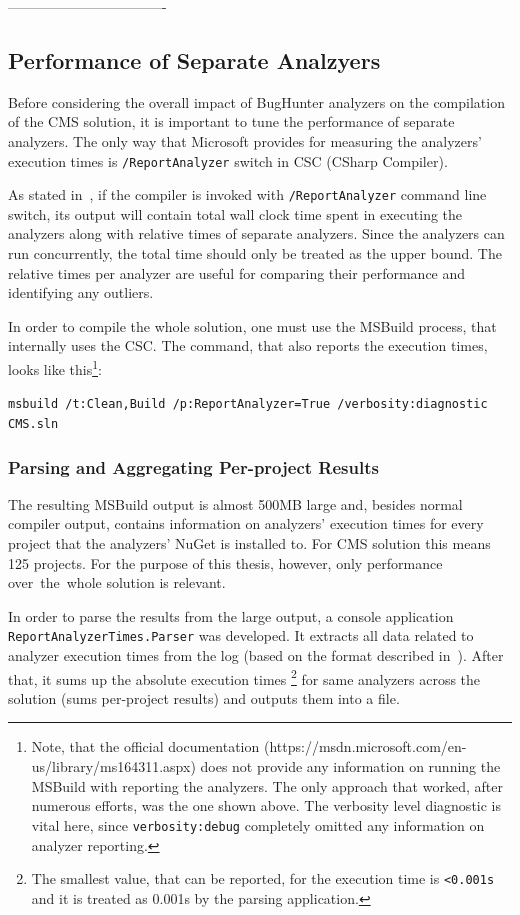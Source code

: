 \documentclass[
  digital, %
  table,   %
  lof,     %
  lot,     %
  oneside,
]{fithesis3}
\begin{document}
----------------------------------

\subsection{Performance of Separate Analzyers}
Before considering the overall impact of BugHunter analyzers on the compilation of the CMS solution, it is important to tune the performance of separate analyzers. The only way that Microsoft provides for measuring the analyzers' execution times is \texttt{/ReportAnalyzer} switch in CSC (CSharp Compiler).

As stated in~\cite{report-analyzer}, if the compiler is invoked with \texttt{/ReportAnalyzer} command line switch, its output will contain total wall clock time spent in executing the analyzers along with relative times of separate analyzers. Since the analyzers can run concurrently, the total time should only be treated as the upper bound. The relative times per analyzer are useful for comparing their performance and identifying any outliers.

In order to compile the whole solution, one must use the MSBuild process, that internally uses the CSC.
The command, that also reports the execution times, looks like this\footnote{Note, that the official documentation (https://msdn.microsoft.com/en-us/library/ms164311.aspx) does not provide any information on running the MSBuild with reporting the analyzers. The only approach that worked, after numerous efforts, was the one shown above. The verbosity level diagnostic is vital here, since \texttt{verbosity:debug} completely omitted any information on analyzer reporting.}:

\begin{center}
\texttt{msbuild /t:Clean,Build /p:ReportAnalyzer=True /verbosity:diagnostic CMS.sln}
\end{center}

\subsubsection{\textbf{Parsing and Aggregating Per-project Results}}
The resulting MSBuild output is almost 500MB large and, besides normal compiler output, contains information on analyzers' execution times for every project that the analyzers' NuGet is installed to. For CMS solution this means 125 projects. For the purpose of this thesis, however, only performance over~the~whole solution is relevant. 

In order to parse the results from the large output, a console application \texttt{ReportAnalyzerTimes.Parser} was developed. It extracts all data related to analyzer execution times from the log (based on the format described in~\cite{report-analyzer}). After that, it sums up the absolute execution times \footnote{The smallest value, that can be reported, for the execution time is \texttt{<0.001s} and it is treated as 0.001s by the parsing application.} for same analyzers across the solution (sums per-project results) and outputs them into a file.
\end{document}
